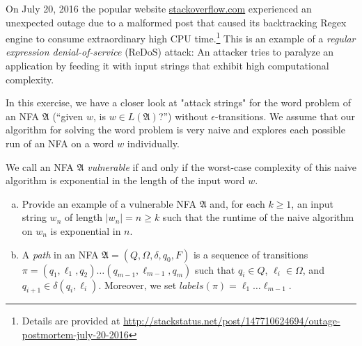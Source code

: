 
\begin{exercise}{40}
        On July 20, 2016 the popular website \href{https://stackoverflow.com}{stackoverflow.com} experienced an unexpected outage due to a malformed post
that caused its backtracking Regex engine to consume extraordinary high CPU time.\footnote{Details are provided at \url{http://stackstatus.net/post/147710624694/outage-postmortem-july-20-2016}}
This is an example of a \emph{regular expression denial-of-service} (ReDoS) attack:
An attacker tries to paralyze an application by feeding it with input strings that exhibit high computational complexity.\par

In this exercise, we have a closer look at "attack strings" for the word problem of an NFA $\mathfrak{A}$ (\enquote{given $w$, is $w \in L(\mathfrak{A})$?}) without $\epsilon$-transitions. We assume that our algorithm for solving the word problem  is very naive and explores each possible run of an NFA on a word $w$ individually.

We call an NFA $\mathfrak{A}$ \emph{vulnerable} if and only if the worst-case complexity of this naive algorithm is exponential in the length of the input word $w$.

\begin{enumerate}[(a)]
  \item Provide an example of a vulnerable NFA $\mathfrak{A}$ and, for each $k \geq 1$, an input string $w_n$ of length $|w_n| = n \geq k$ such that the runtime of the naive algorithm on $w_n$ is exponential in $n$.

  \item A \emph{path} in an NFA $\mathfrak{A} = (Q,\Omega,\delta,q_0,F)$ is a sequence of transitions $\pi = (q_1,\ell_1,q_2)\ldots(q_{m-1},\ell_{m-1},q_m)$ such that $q_i \in Q$, $\ell_i \in \Omega$, and $q_{i+1} \in \delta(q_i,\ell_i)$. Moreover, we set $\textit{labels}(\pi) = \ell_1 \ldots \ell_{m-1}$.


\end{enumerate}
\end{exercise}
